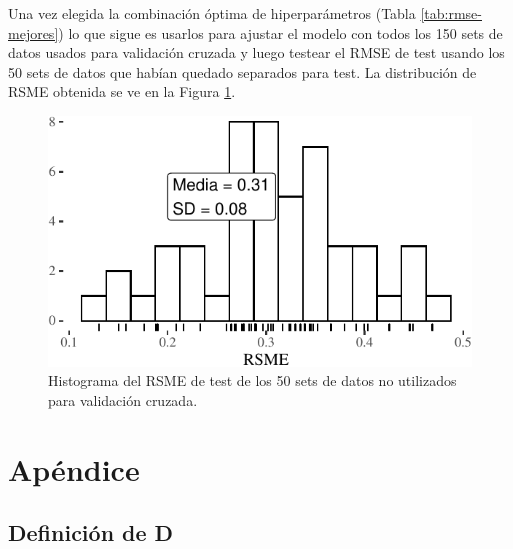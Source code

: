 \documentclass[]{tufte-handout}
\begin{document}
Una vez elegida la combinación óptima de hiperparámetros (Tabla \ref{tab:rmse-mejores}) lo que sigue es usarlos para ajustar el modelo con todos los 150 sets de datos usados para validación cruzada y luego testear el RMSE de test usando los 50 sets de datos que habían quedado separados para test. La distribución de RSME obtenida se ve en la Figura \ref{fig:rmse-test}.

\begin{figure}
\includegraphics{README_files/figure-latex/rmse-test-1} \caption[Histograma del RSME de test de los 50 sets de datos no utilizados para validación cruzada]{Histograma del RSME de test de los 50 sets de datos no utilizados para validación cruzada.}\label{fig:rmse-test}
\end{figure}

\newpage

\hypertarget{apuxe9ndice}{%
\section{Apéndice}\label{apuxe9ndice}}

\hypertarget{def-d}{%
\subsection{Definición de D}\label{def-d}}
\end{document}
